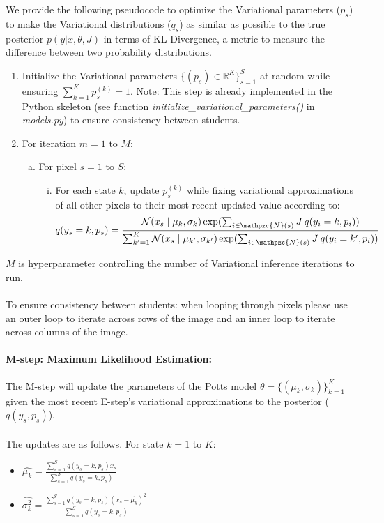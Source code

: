 \documentclass[11pt]{article}
\renewcommand{\hat}[1]{\widehat{#1}}
\begin{document}
We provide the following pseudocode to optimize the Variational parameters ($p_s$) to make the Variational distributions ($q_s$) as similar as possible to the true posterior $p(y|x,\theta,J)$ in terms of KL-Divergence, a metric to measure the difference between two probability distributions.
\begin{enumerate}
    \item Initialize the Variational parameters $\{ (p_s) \in \mathbb{R}^K \}^S_{s=1}$ at random while ensuring $\sum_{k=1}^K p_s^{(k)} = 1$. Note: This step is already implemented in the Python skeleton (see function \textit{initialize\_variational\_parameters()} in \textit{models.py}) to ensure consistency between students.
    \item For iteration $m = 1$ to $M$:
    \begin{enumerate}[(a)]
        \item For pixel $s = 1$ to $S$:
            \begin{enumerate}[(i)]
                \item For each state $k$, update $p_s^{(k)}$ while fixing variational approximations of all other pixels to their most recent updated value according to:
                \begin{equation}\label{eq:vi_update}
                q(y_s=k,p_s)=\frac{\mathcal{N}(x_s \mid \mu_k, \sigma_k) \exp(\sum_{i\in \mathpzc{N}(s)}J\: q(y_i=k,p_i))}{\sum_{k'=1}^K \mathcal{N}(x_s \mid \mu_{k'}, \sigma_{k'}) \exp(\sum_{i\in \mathpzc{N}(s)}J\: q(y_i=k',p_i)) }
                \end{equation}

            \end{enumerate}
    \end{enumerate}
\end{enumerate}

$M$ is hyperparameter controlling the number of Variational inference iterations to run.\\\\
To ensure consistency between students: when looping through pixels please use an outer loop to iterate across rows of the image and an inner loop to iterate across columns of the image.

\paragraph{M-step: Maximum Likelihood Estimation:}
The M-step will update the parameters of the Potts model $\theta=\{ (\mu_k, \sigma_k) \}^K_{k=1}$ given the most recent E-step's variational approximations to the posterior ($q(y_s,p_s)$).\\\\
The updates are as follows. For state $k = 1$ to $K$:
\begin{itemize}
\item $\hat{\mu_k}=\frac{\sum_{s=1}^S q(y_s=k,p_s)x_s}{\sum_{s=1}^S q(y_s=k,p_s)}$
\item $\hat{\sigma^2_k}=\frac{\sum_{s=1}^S q(y_s=k,p_s)(x_s -\hat{\mu_k})^2}{\sum_{s=1}^S q(y_s=k,p_s)}$
\end{itemize}
\end{document}
